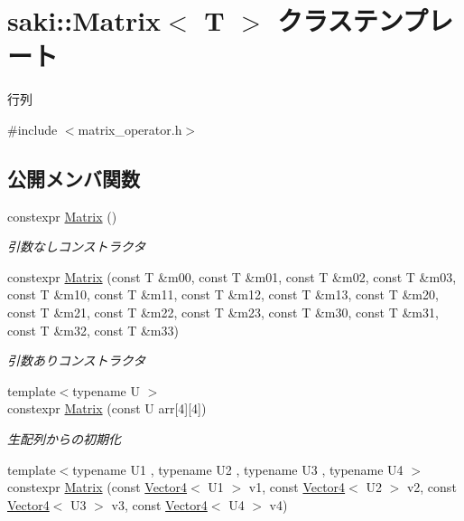 \hypertarget{classsaki_1_1_matrix}{}\section{saki\+:\+:Matrix$<$ T $>$ クラステンプレート}
\label{classsaki_1_1_matrix}


行列  




{\ttfamily \#include $<$matrix\+\_\+operator.\+h$>$}

\subsection*{公開メンバ関数}
\begin{DoxyCompactItemize}
\item 
constexpr \mbox{\hyperlink{classsaki_1_1_matrix_a820035e9bafc0fa4269c4b94b1ec4f4f}{Matrix}} ()
\begin{DoxyCompactList}\small\item\em 引数なしコンストラクタ \end{DoxyCompactList}\item 
constexpr \mbox{\hyperlink{classsaki_1_1_matrix_ad4f497bd4ba2b7de464afea4436d9a51}{Matrix}} (const T \&m00, const T \&m01, const T \&m02, const T \&m03, const T \&m10, const T \&m11, const T \&m12, const T \&m13, const T \&m20, const T \&m21, const T \&m22, const T \&m23, const T \&m30, const T \&m31, const T \&m32, const T \&m33)
\begin{DoxyCompactList}\small\item\em 引数ありコンストラクタ \end{DoxyCompactList}\item 
{\footnotesize template$<$typename U $>$ }\\constexpr \mbox{\hyperlink{classsaki_1_1_matrix_a3d877c3e3581397370561be931972cb9}{Matrix}} (const U arr\mbox{[}4\mbox{]}\mbox{[}4\mbox{]})
\begin{DoxyCompactList}\small\item\em 生配列からの初期化 \end{DoxyCompactList}\item 
{\footnotesize template$<$typename U1 , typename U2 , typename U3 , typename U4 $>$ }\\constexpr \mbox{\hyperlink{classsaki_1_1_matrix_a1a1e4f58fd842e6bfd953ff5b0bd7e37}{Matrix}} (const \mbox{\hyperlink{classsaki_1_1_vector4}{Vector4}}$<$ U1 $>$ v1, const \mbox{\hyperlink{classsaki_1_1_vector4}{Vector4}}$<$ U2 $>$ v2, const \mbox{\hyperlink{classsaki_1_1_vector4}{Vector4}}$<$ U3 $>$ v3, const \mbox{\hyperlink{classsaki_1_1_vector4}{Vector4}}$<$ U4 $>$ v4)

\end{DoxyCompactItemize}
